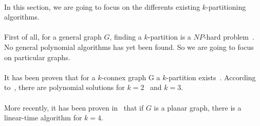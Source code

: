 \paragraph{}
In this section, we are going to focus on the differents existing
$k$-partitioning algorithms.

\paragraph{}
First of all, for a general graph $G$, finding a $k$-partition is a $NP$-hard
problem~\cite{Dyer1985139}. No general polynomial algorithms has yet been found.
So we are going to focus on particular graphs.

\paragraph{}
It has been proven that for a $k$-connex graph G a $k$-partition
exists~\cite{GE78,LL77}.
According to~\cite{JS94}, there are polynomial solutions for
$k=2$~\cite{GE78,LL77} and $k=3$.

\paragraph{}
More recently, it has been proven in~\cite{Nakano1997315} that if $G$ is a planar graph, there is a linear-time algorithm for $k = 4$.





